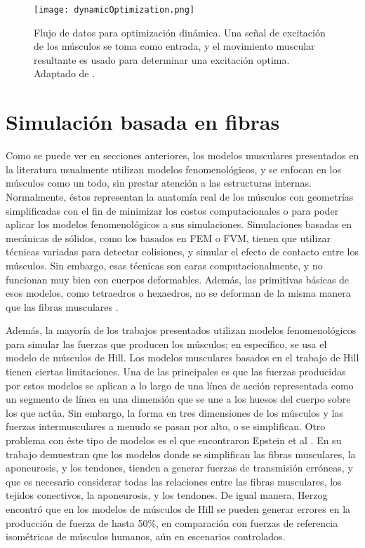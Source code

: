 \begin{figure}
	\centering
		\texttt{[image: dynamicOptimization.png]}
	\caption[Flujo de datos para optimización dinámica.]{Flujo de datos para optimización dinámica. Una señal de excitación de los músculos se toma como entrada, y el movimiento muscular resultante es usado para determinar una excitación optima. Adaptado de \citep{kutz2004standard}.}
		\label{fig:dynamicOptimization}
\end{figure}

\section{Simulación basada en fibras}

Como se puede ver en secciones anteriores, los modelos musculares presentados en la literatura usualmente utilizan modelos fenomenológicos, y se enfocan en los músculos como un todo, sin prestar atención a las estructuras internas. Normalmente, éstos representan la anatomía real de los músculos con geometrías simplificadas con el fin de minimizar los costos computacionales o para poder aplicar los modelos fenomenológicos a sus simulaciones. Simulaciones basadas en mecánicas de sólidos, como los basados en FEM o FVM, tienen que utilizar técnicas variadas para detectar colisiones, y simular el efecto de contacto entre los músculos. Sin embargo, esas técnicas son caras computacionalmente, y no funcionan muy bien con cuerpos deformables. Además, las primitivas básicas de esos modelos, como tetraedros o hexaedros, no se deforman de la misma manera que las fibras musculares \citep{pai2011dynamics}. 

Además, la mayoría de los trabajos presentados utilizan modelos fenomenológicos para simular las fuerzas que producen los músculos; en específico, se usa el modelo de músculos de Hill. Los modelos musculares basados en el trabajo de Hill tienen ciertas limitaciones. Una de las principales es que las fuerzas producidas por estos modelos se aplican a lo largo de una línea de acción representada como un segmento de línea en una dimensión que se une a los huesos del cuerpo sobre los que actúa. Sin embargo, la forma en tres dimensiones de los músculos y las fuerzas intermusculares a menudo se pasan por alto, o se simplifican. Otro problema con éste tipo de modelos es el que encontraron Epstein et al \citep{epstein2006should}. En su trabajo demuestran que los modelos donde se simplifican las fibras musculares, la aponeurosis, y los tendones, tienden a generar fuerzas de transmisión erróneas, y que es necesario considerar todas las relaciones entre las fibras musculares, los tejidos conectivos, la aponeurosis, y los tendones. De igual manera, Herzog \citep{herzog2004history} encontró que en los modelos de músculos de Hill se pueden generar errores en la producción de fuerza de hasta 50\%, en comparación con fuerzas de referencia isométricas de músculos humanos, aún en escenarios controlados.

